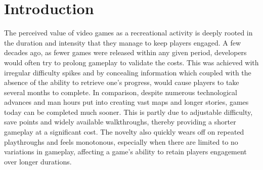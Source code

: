 \documentclass{Configuration_Files/PoliMi3i_thesis}
\begin{document}

\thispagestyle{empty}
\tableofcontents %
\thispagestyle{empty}
\cleardoublepage

%
%
%    
%

\mainmatter %

\chapter{Introduction}
\label{ch:introduction}%

The perceived value of video games as a recreational activity is deeply rooted in the 
duration and intensity that they manage to keep players engaged. A few decades 
ago, as fewer games were released within any given period, developers would often 
try to prolong gameplay to validate the costs. This was achieved with irregular 
difficulty spikes and by concealing information which coupled with the absence of 
the ability to retrieve one’s progress, would cause players to take several months to 
complete. In comparison, despite numerous technological advances and man hours 
put into creating vast maps and longer stories, games today can be completed much 
sooner. This is partly due to adjustable difficulty, save points and widely available 
walkthroughs, thereby providing a shorter gameplay at a significant cost. The 
novelty also quickly wears off on repeated playthroughs and feels monotonous, 
especially when there are limited to no variations in gameplay, affecting a game’s 
ability to retain players engagement over longer durations.
\end{document}
